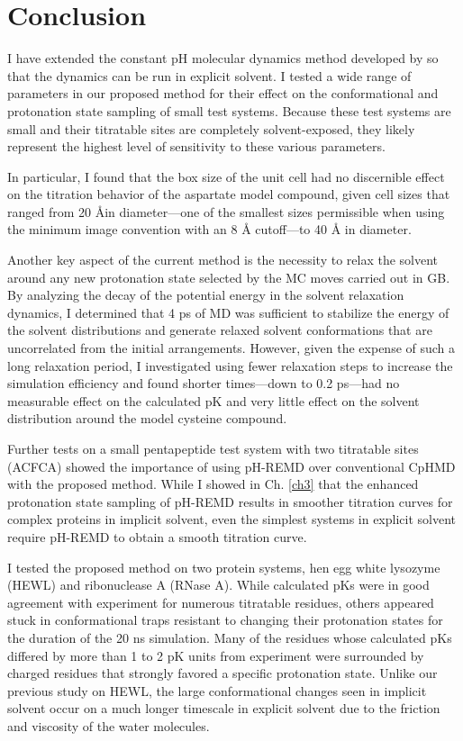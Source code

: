 \section{Conclusion}

I have extended the constant pH molecular dynamics method developed by
\citeauthor{Mongan_JComputChem_2004_v25_p2038}
\cite{Mongan_JComputChem_2004_v25_p2038} so that the dynamics can be run in
explicit solvent. I tested a wide range of parameters in our proposed method
for their effect on the conformational and protonation state sampling of small
test systems. Because these test systems are small and their titratable sites
are completely solvent-exposed, they likely represent the highest level of
sensitivity to these various parameters.

In particular, I found that the box size of the unit cell had no discernible
effect on the titration behavior of the aspartate model compound, given cell
sizes that ranged from 20 \AA in diameter---one of the smallest sizes
permissible when using the minimum image convention with an 8 \AA{} cutoff---to
40 \AA{} in diameter.

Another key aspect of the current method is the necessity to relax the solvent
around any new protonation state selected by the MC moves carried out in GB. By
analyzing the decay of the potential energy in the solvent relaxation dynamics,
I determined that 4 ps of MD was sufficient to stabilize the energy of the
solvent distributions and generate relaxed solvent conformations that are
uncorrelated from the initial arrangements. However, given the expense of such a
long relaxation period, I investigated using fewer relaxation steps to increase
the simulation efficiency and found shorter times---down to 0.2 ps---had no
measurable effect on the calculated pK and very little effect on the
solvent distribution around the model cysteine compound.

Further tests on a small pentapeptide test system with two titratable sites
(ACFCA) showed the importance of using pH-REMD over conventional CpHMD with the
proposed method. While I showed in Ch. \ref{ch3} that the enhanced protonation
state sampling of pH-REMD results in smoother titration curves for complex
proteins in implicit solvent, \cite{Swails_JChemTheoryComput_2012_v8_p4393} even
the simplest systems in explicit solvent require pH-REMD to obtain a smooth
titration curve.

I tested the proposed method on two protein systems, hen egg white lysozyme
(HEWL) and ribonuclease A (RNase A). While calculated pKs were in good
agreement with experiment for numerous titratable residues, others appeared
stuck in conformational traps resistant to changing their protonation states for
the duration of the 20 ns simulation. Many of the residues whose calculated
pKs differed by more than 1 to 2 pK units from experiment were
surrounded by charged residues that strongly favored a specific protonation
state.  Unlike our previous study on HEWL,
\cite{Swails_JChemTheoryComput_2012_v8_p4393} the large conformational changes
seen in implicit solvent occur on a much longer timescale in explicit solvent
due to the friction and viscosity of the water molecules.

